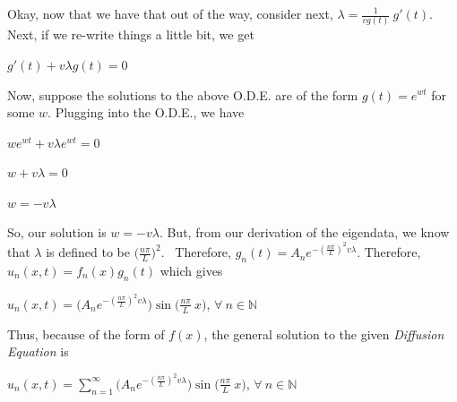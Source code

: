 \documentclass[12pt, executivepaper]{article}
\begin{document}
\begin{flushleft}
\vspace{2mm}

Okay, now that we have that out of the way, consider next, $\lambda=\frac{1}{vg(t)} \ g'(t)$. Next, if we re-write things a little bit, we get

\begin{center}

$g'(t)+v \lambda g(t)=0$

\end{center}

Now, suppose the solutions to the above O.D.E. are of the form $g(t)=e^{wt}$ for some $w$. Plugging into the O.D.E., we have

\begin{center}

$we^{wt}+v \lambda e^{wt}=0$

\vspace{2mm}

$w+v \lambda=0$

\vspace{2mm}

$w=-v \lambda$

\end{center}

So, our solution is $w=-v \lambda$. But, from our derivation of the eigendata, we know that $\lambda$ is defined to be $\bigg(\frac{n\pi}{L}\bigg)^2$. {~}Therefore, $g_{n}(t)=A_{n}e^{-(\frac{n\pi}{L})^2 v \lambda}$. Therefore, $u_{n}(x,t)=f_{n}(x)g_{n}(t)$ which gives

\begin{center}

$u_{n}(x,t)=\bigg(A_{n}e^{-(\frac{n\pi}{L})^2 v \lambda}\bigg) \sin\bigg(\frac{n \pi}{L} \ x\bigg)$, $\forall {~} n \in \mathbb{N}$

\end{center}

Thus, because of the form of $f(x)$, the general solution to the given \textit{Diffusion Equation} is

\begin{center}

$u_{n}(x,t)=\sum_{n=1}^{\infty}\bigg(A_{n}e^{-(\frac{n\pi}{L})^2 v \lambda}\bigg) \sin\bigg(\frac{n \pi}{L} \ x\bigg)$, $\forall {~} n \in \mathbb{N}$

\end{center} 

\end{flushleft}
\end{document}
